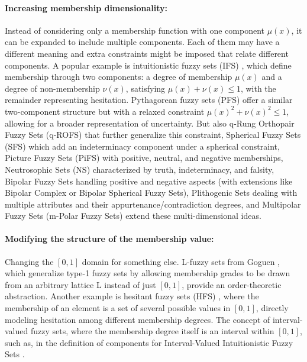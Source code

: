 \paragraph{Increasing membership dimensionality:} Instead of considering only a membership function with one component $\mu(x)$, it can be expanded to include multiple components. Each of them may have a different meaning and extra constraints might be imposed that relate different components. A popular example is intuitionistic fuzzy sets (IFS) \cite{Atanassov1986}, which define membership through two components: a degree of membership $\mu(x)$ and a degree of non-membership $\nu(x)$, satisfying $\mu(x) + \nu(x) \leq 1$, with the remainder representing hesitation. Pythagorean fuzzy sets (PFS) \cite{Yager2013_Pythagorean} offer a similar two-component structure but with a relaxed constraint $\mu(x)^2 + \nu(x)^2 \leq 1$, allowing for a broader representation of uncertainty. But also q-Rung Orthopair Fuzzy Sets (q-ROFS) \cite{Yager2017_qRung} that further generalize this constraint, Spherical Fuzzy Sets (SFS) \cite{GundogduKahraman2019_Spherical} which add an indeterminacy component under a spherical constraint, Picture Fuzzy Sets (PiFS) \cite{Cuong2013_Picture} with positive, neutral, and negative memberships, Neutrosophic Sets (NS) \cite{Smarandache1998_Neutrosophic, Wang2010_SVNS} characterized by truth, indeterminacy, and falsity, Bipolar Fuzzy Sets \cite{Zhang1994_Bipolar} handling positive and negative aspects (with extensions like Bipolar Complex or Bipolar Spherical Fuzzy Sets), Plithogenic Sets \cite{Smarandache2018_Plithogenic} dealing with multiple attributes and their appurtenance/contradiction degrees,  and Multipolar Fuzzy Sets (m-Polar Fuzzy Sets) \cite{Chen2014_mPolar} extend these multi-dimensional ideas.

\paragraph{Modifying the structure of the membership value:} Changing the $[0,1]$ domain for something else. L-fuzzy sets from Goguen \cite{Goguen1967}, which generalize type-1 fuzzy sets by allowing membership grades to be drawn from an arbitrary lattice L instead of just $[0,1]$, provide an order-theoretic abstraction. Another example is hesitant fuzzy sets (HFS) \cite{Torra2010}, where the membership of an element is a set of several possible values in $[0,1]$, directly modeling hesitation among different membership degrees. The concept of interval-valued fuzzy sets, where the membership degree itself is an interval within $[0,1]$, such as, in the definition of components for Interval-Valued Intuitionistic Fuzzy Sets \cite{AtanassovGargov1989}.

